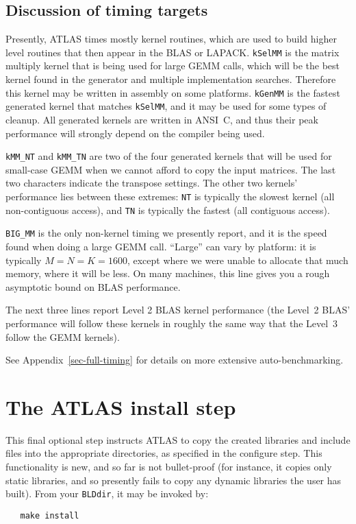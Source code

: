 \documentclass[11pt]{article}
\begin{document}
\subsection{Discussion of timing targets}
Presently, ATLAS times mostly kernel routines, which are used to build
higher level routines that then appear in the BLAS or LAPACK.
{\tt kSelMM} is the matrix multiply kernel that is being used for large
GEMM calls, which will be the best kernel found in the generator and
multiple implementation searches.  Therefore this kernel may be written
in assembly on some platforms.
{\tt kGenMM} is the fastest generated kernel that matches {\tt kSelMM},
and it may be used for some types of cleanup.  All generated kernels
are written in ANSI~C, and thus their peak performance will strongly
depend on the compiler being used.

{\tt kMM\_NT} and {\tt kMM\_TN} are two of the four generated kernels that
will be used for small-case GEMM when we cannot afford to copy the input
matrices.  The last two characters indicate the transpose settings.
The other two kernels' performance lies between these extremes:
{\tt NT} is typically the slowest kernel (all non-contiguous access),
and {\tt TN} is typically the fastest (all contiguous access).

{\tt BIG\_MM} is the only non-kernel timing we presently report, and it is
the speed found when doing a large GEMM call.  ``Large'' can vary by platform:
it is typically $M=N=K=1600$, except where we were unable to allocate that
much memory, where it will be less.  On many machines, this line gives you
a rough asymptotic bound on BLAS performance.

The next three lines report Level 2 BLAS kernel performance (the Level~2
BLAS' performance will follow these kernels in roughly the same way that
the Level~3 follow the GEMM kernels).

See Appendix~\ref{sec-full-timing} for details on more extensive 
auto-benchmarking.

\section{The ATLAS install step}
\label{sec-install-step}
This final optional step instructs ATLAS to copy the created libraries
and include files into the appropriate directories, as specified in
the configure step.  This functionality is new, and so far
is not bullet-proof (for instance, it copies only static libraries,
and so presently fails to copy any dynamic libraries the user has built).
From your {\tt BLDdir}, it may be invoked by:
\vspace*{-0.1in}
\begin{verbatim}
   make install
\end{verbatim}
\end{document}

